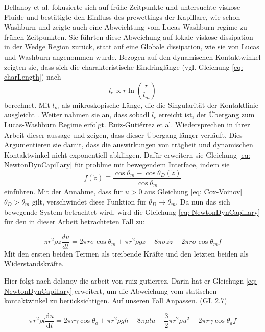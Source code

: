 Dellanoy et al. \cite{delannoy2019DualRoleViscosity} fokusierte sich auf frühe Zeitpunkte und untersuchte viskose Fluide und bestätigte den Einfluss des prewettings der Kapillare, wie schon Washburn \cite{washburn1921DynamicsCapillaryFlow} und zeigte auch eine Abweichtung vom Lucas-Washburn regime zu frühen Zeitpunkten. Sie führten diese Abweichung auf lokale viskose dissipation in der Wedge Region zurück, statt auf eine Globale dissipation, wie sie von Lucas und Washburn angenommen wurde. Bezogen auf den dynamischen Kontaktwinkel zeigten sie, dass sich die charakteristische Eindringlänge (vgl. Gleichung \ref{eq: charLength}) nach 
\begin{equation}
    l_c \propto r \ln\left(\frac{r}{l_m}\right)
\end{equation}
berechnet. Mit $l_m$ als mikroskopische Länge, die die Singularität der Kontaktlinie ausgleicht \cite{cox1986DynamicsSpreadingLiquids}. Weiter nahmen sie an, dass sobadl $l_c$ erreicht ist, der Übergang zum Lucas-Washburn Regime erfolgt.
Ruiz-Gutiérrez et al. \cite{ruiz-gutierrez2022LongCrossoverDynamics} Wiedersprechen in ihrer Arbeit dieser aussage und zeigen, dass dieser Übergang länger verläuft. Dies Argumentieren sie damit, dass die auswirkungen von trägheit und dynamischen Kontaktwinkel nicht exponentiell abklingen. 
Dafür erweitern sie Gleichung \ref{eq: NewtonDynCapillary} für problme mit bewegendem Interface, indem sie 
\begin{equation}
    f(\dot{z}) \equiv \frac{\cos\theta_{m}-\cos\theta_D(\dot{z})}{\cos\theta_m} 
\end{equation}
einführen. Mit der Annahme, dass für $u>0$ aus Gleichung \ref{eq: Cox-Voinov} $\theta_D > \theta_m$ gilt, verschwindet diese Funktion für $\theta_D \rightarrow \theta_m$. 
Da nun das sich bewegende System betrachtet wird, wird die Gleichung \ref{eq: NewtonDynCapillary} für den in dieser Arbeit betrachteten Fall zu:

\begin{equation}
    \pi r^{2}\rho z \frac{du}{dt}= 2\pi r\sigma \cos\theta_{m}+\pi r^{2}\rho gz-8\pi \sigma z \dot{z} -2\pi r \sigma \cos \theta_{m}f
\end{equation}
Mit den ersten beiden Termen als treibende Kräfte und den letzten beiden als Widerstandskräfte.


Hier folgt nach delanoy die arbeit von ruiz gutierrez. Darin hat er Gleichugn \ref{eq: NewtonDynCapillary} erweitert, um die Abweichung vom statischen kontaktwinkel zu berücksichtigen. Auf unseren Fall Anpassen. (GL 2.7)





\begin{equation}
    \pi r^2\rho l\frac{\mathrm{d}u}{\mathrm{d}t}=2\pi r\gamma\cos\theta_a+\pi r^2\rho gh-8\pi\mu lu-\frac{3}{2}\pi r^2\rho u^2-2\pi r\gamma\cos\theta_af
\end{equation}
